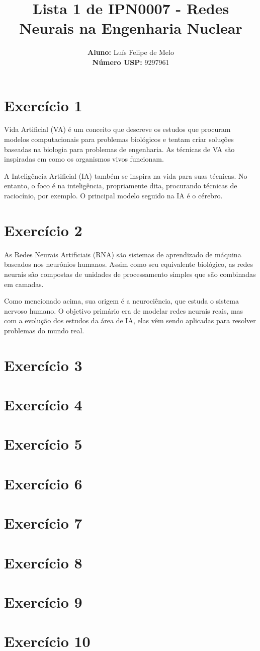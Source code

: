 \documentclass{article}
\title{\textbf{Lista 1 de IPN0007 - Redes Neurais na Engenharia Nuclear}}
\author{
    \textbf{Aluno:} Luís Felipe de Melo  \\
    \textbf{Número USP:} 9297961
    }
\date{}
\begin{document}
\maketitle

\section*{Exercício 1}

Vida Artificial (VA) é um conceito que descreve os estudos que procuram modelos computacionais para problemas biológicos e tentam criar soluções baseadas na biologia para problemas de engenharia. As técnicas de VA são inspiradas em como os organismos vivos funcionam.

A Inteligência Artificial (IA) também se inspira na vida para suas técnicas. No entanto, o foco é na inteligência, propriamente dita, procurando técnicas de raciocínio, por exemplo. O principal modelo seguido na IA é o cérebro.

\section*{Exercício 2}

As Redes Neurais Artificiais (RNA) são sistemas de aprendizado de máquina baseados nos neurônios humanos. Assim como seu equivalente biológico, as redes neurais são compostas de unidades de processamento simples que são combinadas em camadas.

Como mencionado acima, sua origem é a neurociência, que estuda o sistema nervoso humano. O objetivo primário era de modelar redes neurais reais, mas com a evolução dos estudos da área de IA, elas vêm sendo aplicadas para resolver problemas do mundo real.

\section*{Exercício 3}
\section*{Exercício 4}
\section*{Exercício 5}
\section*{Exercício 6}
\section*{Exercício 7}
\section*{Exercício 8}
\section*{Exercício 9}
\section*{Exercício 10}
\end{document}
